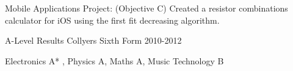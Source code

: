 \begin{cventries}
{\begin{cvitems}
          \item{Mobile Applications Project: (Objective C) Created a resistor combinations calculator for iOS using the first fit decreasing algorithm.}
      \end{cvitems}
    }

  \cventry
    {A-Level Results} %
    {Collyers Sixth Form} %
    {} %
    {2010-2012} %
    {
      \begin{cvitems}
        \item Electronics A* , Physics A, Maths A, Music Technology B
      \end{cvitems}
    }

\end{cventries}
